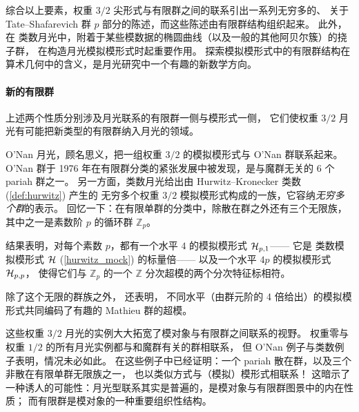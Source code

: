 \documentclass[11pt,a4paper,fontset=windows]{ctexart}
\numberwithin{equation}{section}
\newcommand{\myparagraph}[1]{\paragraph{#1}\mbox\\}
\newcommand{\ZZ}{\mathbb{Z}}
\newcommand{\eq}[1]{(\ref{#1})}
\begin{document}
综合以上要素，权重 $3/2$ 尖形式与有限群之间的联系引出一系列无穷多的、
关于 Tate–Shafarevich 群 $p$ 部分的陈述，而这些陈述由有限群结构组织起来。
此外，在 类数月光中，附着于某些模数据的椭圆曲线（以及一般的其他阿贝尔簇）的挠子群，
在构造月光模拟模形式时起重要作用。
探索模拟模形式中的有限群结构在算术几何中的含义，是月光研究中一个有趣的新数学方向。

\myparagraph{新的有限群}

上述两个性质分别涉及月光联系的有限群一侧与模形式一侧，
它们使权重 $3/2$ 月光有可能把新类型的有限群纳入月光的领域。

O'Nan 月光，顾名思义，把一组权重 $3/2$ 的模拟模形式与 O'Nan 群联系起来。
O'Nan 群于 1976 年在有限群分类的紧张发展中被发现，是与魔群无关的 6 个 pariah 群之一。
另一方面，类数月光给出由 Hurwitz–Kronecker 类数 \eq{def:hurwitz} 产生的
无穷多个权重 $3/2$ 模拟模形式构成的一族，它容纳\emph{无穷多个群}的表示。
回忆一下：在有限单群的分类中，除散在群之外还有三个无限族，
其中之一是素数阶 $p$ 的循环群 $\ZZ_p$。



结果表明，对每个素数 $p$，都有一个水平 $4$ 的模拟模形式 ${\cal H}_{p,1}$——
它是 类数模拟模形式 ${\cal H}$ \eq{hurwitz_mock} 的标量倍——
以及一个水平 $4p$ 的模拟模形式 ${\cal H}_{p,p}$，
使得它们与 $\ZZ_p$ 的一个 $\ZZ$ 分次超模的两个分次特征标相符。


除了这个无限的群族之外，\cite{class_nr_moonshine} 还表明，
不同水平（由群元阶的 4 倍给出）的模拟模形式共同编码了有趣的 Mathieu 群的超模。

这些权重 $3/2$ 月光的实例大大拓宽了模对象与有限群之间联系的视野。
权重零与权重 $1/2$ 的所有月光实例都与和魔群有关的群相联系，
但 O'Nan 例子与类数例子表明，情况未必如此。
在这些例子中已经证明：一个 pariah 散在群，以及三个非散在有限单群无限族之一，
也以类似方式与（模拟）模形式相联系！
这暗示了一种诱人的可能性：月光型联系其实是普遍的，是模对象与有限群图景中的内在性质；
而有限群是模对象的一种重要组织性结构。
\end{document}
